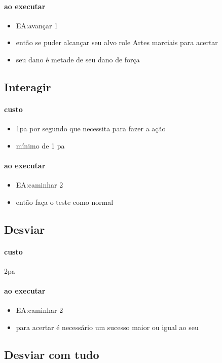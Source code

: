 \paragraph{ao executar}
\begin{itemize}
  \item EA:avançar 1
  \item então se puder alcançar seu alvo role Artes marciais para acertar
  \item seu dano é metade de seu dano de força
\end{itemize}
%
\subsection{Interagir}
\paragraph{custo}
\begin{itemize}
  \item 1pa por segundo que necessita para fazer a ação
  \item mínimo de 1 pa
\end{itemize}
\paragraph{ao executar}
\begin{itemize}
  \item EA:caminhar 2 
  \item então faça o teste como normal
\end{itemize}
%
\subsection{Desviar}
\paragraph{custo} 2pa
\paragraph{ao executar}
\begin{itemize}
  \item EA:caminhar 2
  \item para acertar é necessário um sucesso maior ou igual ao seu
\end{itemize}
%
\subsection{Desviar com tudo}
